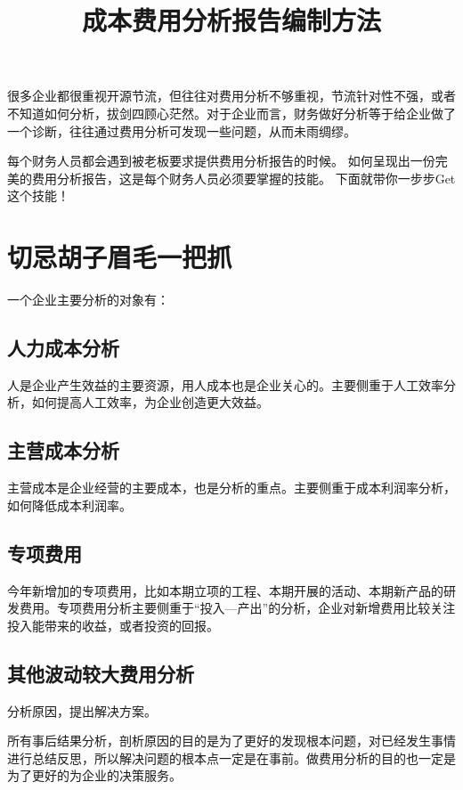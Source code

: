 \documentclass[a4paper]{article}
\title{%
\zihao{2}\textbf{成本费用分析报告编制方法}%
}
\author{}
\date{}
\begin{document}
\maketitle
\pagestyle{plain}
{}
很多企业都很重视开源节流，但往往对费用分析不够重视，节流针对性不强，或者不知道如何分析，拔剑四顾心茫然。对于企业而言，财务做好分析等于给企业做了一个诊断，往往通过费用分析可发现一些问题，从而未雨绸缪。

每个财务人员都会遇到被老板要求提供费用分析报告的时候。
如何呈现出一份完美的费用分析报告，这是每个财务人员必须要掌握的技能。
下面就带你一步步Get这个技能！


\section{切忌胡子眉毛一把抓}

一个企业主要分析的对象有：

\subsection{人力成本分析}

人是企业产生效益的主要资源，用人成本也是企业关心的。主要侧重于人工效率分析，如何提高人工效率，为企业创造更大效益。

\subsection{主营成本分析}

主营成本是企业经营的主要成本，也是分析的重点。主要侧重于成本利润率分析，如何降低成本利润率。

\subsection{专项费用}

今年新增加的专项费用，比如本期立项的工程、本期开展的活动、本期新产品的研发费用。专项费用分析主要侧重于“投入—产出”的分析，企业对新增费用比较关注投入能带来的收益，或者投资的回报。

\subsection{其他波动较大费用分析}

分析原因，提出解决方案。

所有事后结果分析，剖析原因的目的是为了更好的发现根本问题，对已经发生事情进行总结反思，所以解决问题的根本点一定是在事前。做费用分析的目的也一定是为了更好的为企业的决策服务。
\end{document}
